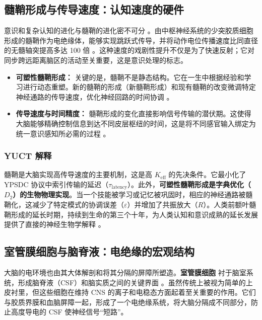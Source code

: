 \documentclass[12pt,a4paper]{article}
\begin{document}
	\subsection{髓鞘形成与传导速度：认知速度的硬件}
	
	意识和复杂认知的进化与髓鞘的进化密不可分 \cite{Fields2008}。由中枢神经系统的少突胶质细胞形成的髓鞘作为电绝缘体，能够实现跳跃式传导，并将动作电位传播速度比同直径的无髓轴突提高多达 100 倍 \cite{Waxman1980}。这种速度的戏剧性提升不仅是为了快速反射；它对同步跨远距离脑区的活动至关重要，这是意识处理的标志。
	
	\begin{itemize}
		\item \textbf{可塑性髓鞘形成：} 关键的是，髓鞘不是静态结构。它在一生中根据经验和学习进行动态重塑。新的髓鞘的形成（新髓鞘形成）和现有髓鞘的改变微调特定神经通路的传导速度，优化神经回路的时间协调 \cite{deFaria2021, Monje2023}。
		\item \textbf{传导速度与时间精度：} 髓鞘形成的变化直接影响信号传输的潜伏期。这使得大脑能够精确控制信息到达不同皮层枢纽的时间，这是将不同感官输入绑定为统一意识感知所必需的过程 \cite{Pajevic2014}。
	\end{itemize}
	
	\subsubsection*{YUCT 解释}
	髓鞘是大脑实现高传导速度的主要机制，这是高 \(K_{\mathrm{eff}}\) 的先决条件。它最小化了 YPSDC 协议中索引传输的延迟（\(\tau_{\text{latency}}\)）。此外，\textbf{可塑性髓鞘形成是字典优化（\(D_2\)）的生物物理实现}。当一个技能被学习或记忆被巩固时，相应的神经通路被髓鞘化，这减少了特定模式的协调误差（\(\varepsilon\)）并增加了共振放大（\(R\)）。人类前额叶髓鞘形成的延长时期，持续到生命的第三个十年，为人类认知和意识成熟的延长发展提供了直接的神经生物学解释 \cite{Miller2012, Fields2015}。
	
	\subsection{室管膜细胞与脑脊液：电绝缘的宏观结构}
	
	大脑的电环境也由其大体解剖和将其分隔的屏障所塑造。\textbf{室管膜细胞} 衬于脑室系统，形成脑脊液（CSF）和脑实质之间的关键界面 \cite{DelBigio2010}。虽然传统上被视为简单的上皮衬里，但这些细胞在维持 CNS 的离子和电稳态方面起着至关重要的作用。它们与胶质界膜和血脑屏障一起，形成了一个电绝缘系统，将大脑分隔成不同部分，防止高度导电的 CSF 使神经信号“短路”。
	
\end{document}
